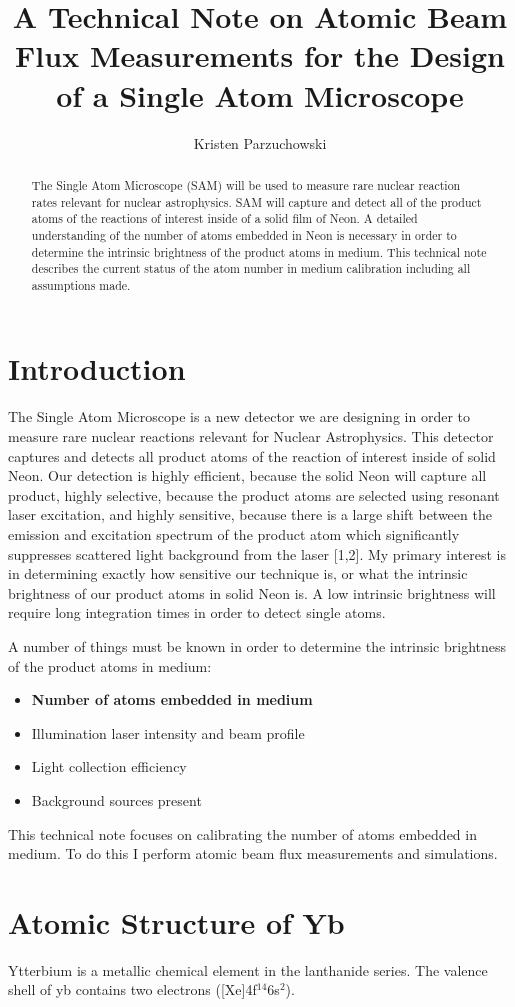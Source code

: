 \documentclass[12pt, a4paper]{article}
\title{A Technical Note on Atomic Beam Flux Measurements for the Design of a Single Atom Microscope}
\author{Kristen Parzuchowski}
\begin{document}
\maketitle
\begin{abstract}
The Single Atom Microscope (SAM) will be used to measure rare nuclear reaction rates relevant for nuclear astrophysics. SAM will capture and detect all of the product atoms of the reactions of interest inside of a solid film of Neon. A detailed understanding of the number of atoms embedded in Neon is necessary in order to determine the intrinsic brightness of the product atoms in medium. This technical note describes the current status of the atom number in medium calibration including all assumptions made.
\end{abstract}
\section{Introduction}
The Single Atom Microscope is a new detector we are designing in order to measure rare nuclear reactions relevant for Nuclear Astrophysics. This detector captures and detects all product atoms of the reaction of interest inside of solid Neon. Our detection is highly efficient, because the solid Neon will capture all product, highly selective, because the product atoms are selected using resonant laser excitation, and highly sensitive, because there is a large shift between the emission and excitation spectrum of the product atom which significantly suppresses scattered light background from the laser [1,2]. My primary interest is in determining exactly how sensitive our technique is, or what the intrinsic brightness of our product atoms in solid Neon is. A low intrinsic brightness will require long integration times in order to detect single atoms. 

A number of things must be known in order to determine the intrinsic brightness of the product atoms in medium:
\begin{itemize}
\item \textbf{Number of atoms embedded in medium}
\item Illumination laser intensity and beam profile
\item Light collection efficiency
\item Background sources present
\end{itemize}
This technical note focuses on calibrating the number of atoms embedded in medium. To do this I perform atomic beam flux measurements and simulations. 
\section{Atomic Structure of Yb}
Ytterbium is a metallic chemical element in the lanthanide series. The valence shell of yb contains two electrons ([Xe]4f$^{14}$6s$^{2}$).
\end{document}

